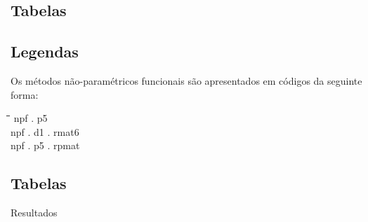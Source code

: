 \documentclass[
	12pt,				%
	openright,			%
	oneside,			%
	a4paper,			%
	english,			%
	brazil				%
	]{dissertacao-ufrgs-abntex2}
\begin{document}
\begin{apendicesenv}
%
\partapendices
%



\chapter{Tabelas} \label{tabelas-resultados}


\section{Legendas}

Os métodos não-paramétricos funcionais são apresentados em códigos da seguinte forma:
\begin{tabbing}
\hspace{1cm}\=\hspace{0.5cm}\=\hspace{1cm}\=\hspace{0.5cm}\=\kill
npf \> . \> p5 \>  \> \\ 
npf \> . \> d1 \> . \> rmat6 \\ 
npf \> . \> p5  \> . \> rpmat
\end{tabbing} 


\section{Tabelas}

Resultados





\end{apendicesenv}
\end{document}
